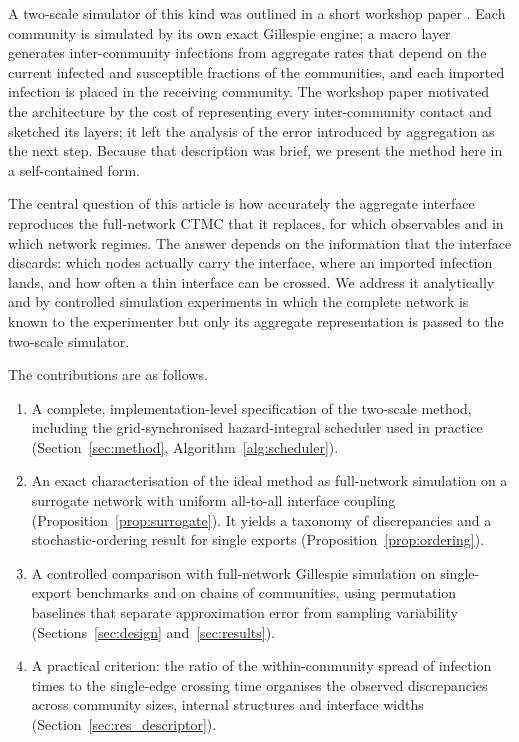 \documentclass[a4paper,fleqn]{cas-sc}
\begin{document}
A two-scale simulator of this kind was outlined in a short workshop paper \citep{kuryliak2025towards}. Each community is simulated by its own exact Gillespie engine; a macro layer generates inter-community infections from aggregate rates that depend on the current infected and susceptible fractions of the communities, and each imported infection is placed in the receiving community. The workshop paper motivated the architecture by the cost of representing every inter-community contact and sketched its layers; it left the analysis of the error introduced by aggregation as the next step. Because that description was brief, we present the method here in a self-contained form.

The central question of this article is how accurately the aggregate interface reproduces the full-network CTMC that it replaces, for which observables and in which network regimes. The answer depends on the information that the interface discards: which nodes actually carry the interface, where an imported infection lands, and how often a thin interface can be crossed. We address it analytically and by controlled simulation experiments in which the complete network is known to the experimenter but only its aggregate representation is passed to the two-scale simulator.

The contributions are as follows.
\begin{enumerate}
\item A complete, implementation-level specification of the two-scale method, including the grid-synchronised hazard-integral scheduler used in practice (Section~\ref{sec:method}, Algorithm~\ref{alg:scheduler}).
\item An exact characterisation of the ideal method as full-network simulation on a surrogate network with uniform all-to-all interface coupling (Proposition~\ref{prop:surrogate}). It yields a taxonomy of discrepancies and a stochastic-ordering result for single exports (Proposition~\ref{prop:ordering}).
\item A controlled comparison with full-network Gillespie simulation on single-export benchmarks and on chains of communities, using permutation baselines that separate approximation error from sampling variability (Sections~\ref{sec:design} and~\ref{sec:results}).
\item A practical criterion: the ratio of the within-community spread of infection times to the single-edge crossing time organises the observed discrepancies across community sizes, internal structures and interface widths (Section~\ref{sec:res_descriptor}).
\end{enumerate}
\end{document}
